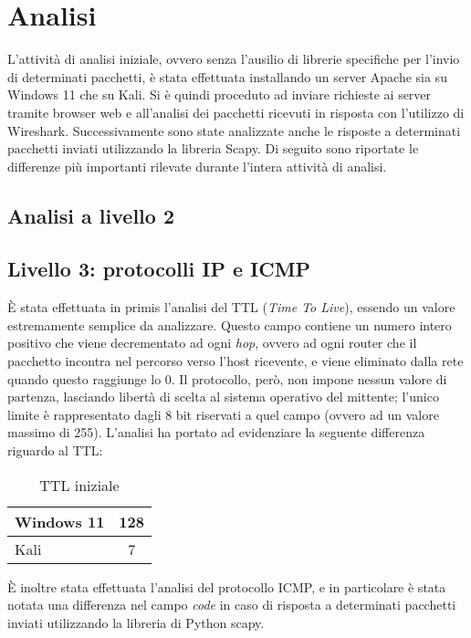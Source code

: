 \chapter{Analisi}
L'attività di analisi iniziale, ovvero senza l'ausilio di librerie specifiche per l'invio di determinati pacchetti, è stata effettuata installando un server Apache sia su Windows 11 che su Kali.
Si è quindi proceduto ad inviare richieste ai server tramite browser web e all'analisi dei pacchetti ricevuti in risposta con l'utilizzo di Wireshark.
Successivamente sono state analizzate anche le risposte a determinati pacchetti inviati utilizzando la libreria Scapy.
Di seguito sono riportate le differenze più importanti rilevate durante l'intera attività di analisi.
\section{Analisi a livello 2}


\section{Livello 3: protocolli IP e ICMP}
È stata effettuata in primis l'analisi del TTL (\textit{Time To Live}), essendo un valore estremamente semplice da analizzare.
Questo campo contiene un numero intero positivo che viene decrementato ad ogni \textit{hop}, ovvero ad ogni router che il pacchetto incontra nel percorso verso l'host ricevente, e viene eliminato dalla rete quando questo raggiunge lo 0.
Il protocollo, però, non impone nessun valore di partenza, lasciando libertà di scelta al sistema operativo del mittente; l'unico limite è rappresentato dagli 8 bit riservati a quel campo (ovvero ad un valore massimo di 255).
L'analisi ha portato ad evidenziare la seguente differenza riguardo al TTL:
\begin{table}[H]
	\centering
	\begin{tabular}{ l | c }
		\hline
		\rowcolor{blue!10} Windows 11 & 128
		\\
		\hline
		\rowcolor{red!10} Kali & 7
		\\
		\hline
		
	\end{tabular}
	\caption{TTL iniziale}
	\label{tab:TTL}
\end{table}

È inoltre stata effettuata l'analisi del protocollo ICMP, e in particolare è stata notata una differenza nel campo \textit{code} in caso di risposta a determinati pacchetti inviati utilizzando la libreria di Python scapy.
\\

